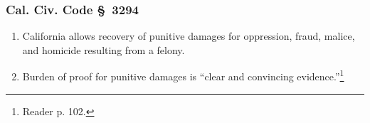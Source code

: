 \subsubsection{Cal. Civ. Code \S\ 3294}

\begin{enumerate}
    \item California allows recovery of punitive damages for oppression, 
    fraud, malice, and homicide resulting from a felony.
    \item Burden of proof for punitive damages is ``clear and convincing
    evidence.''\footnote{Reader p. 102.}
\end{enumerate}
